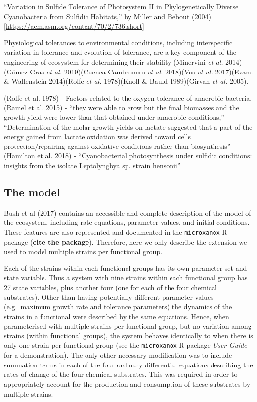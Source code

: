 \documentclass{article}
\begin{document}
``Variation in Sulfide Tolerance of Photosystem II in Phylogenetically
Diverse Cyanobacteria from Sulfidic Habitats,'' by Miller and Bebout
(2004) {[}\url{https://aem.asm.org/content/70/2/736.short}{]}

Physiological tolerances to environmental conditions, including
interspecific variation in tolerance and evolution of tolerance, are a
key component of the engineering of ecosystem for determining their
stability (Minervini \emph{et al.} 2014)(Gómez‐Gras \emph{et al.}
2019)(Cuenca Cambronero \emph{et al.} 2018)(Vos \emph{et al.}
2017)(Evans \& Wallenstein 2014)(Rolfe \emph{et al.} 1978)(Knoll \&
Bauld 1989)(Girvan \emph{et al.} 2005).

(Rolfe et al. 1978) - Factors related to the oxygen tolerance of
anaerobic bacteria. (Ramel et al. 2015) - ``they were able to grow but
the final biomasses and the growth yield were lower than that obtained
under anaerobic conditions,'' ``Determination of the molar growth yields
on lactate suggested that a part of the energy gained from lactate
oxidation was derived toward cells protection/repairing against
oxidative conditions rather than biosynthesis'' (Hamilton et al. 2018) -
``Cyanobacterial photosynthesis under sulfidic conditions: insights from
the isolate Leptolyngbya sp. strain hensonii''

\hypertarget{the-model}{%
\subsection{The model}\label{the-model}}

Bush et al (2017) contains an accessible and complete description of the
model of the ecosystem, including rate equations, parameter values, and
initial conditions. These features are also represented and documented
in the \texttt{microxanox} R package (\textbf{cite the package}).
Therefore, here we only describe the extension we used to model multiple
strains per functional group.

Each of the strains within each functional groups has its own parameter
set and state variable. Thus a system with nine strains within each
functional group has 27 state variables, plus another four (one for each
of the four chemical substrates). Other than having potentially
different parameter values (e.g.~maximum growth rate and tolerance
parameters) the dynamics of the strains in a functional were described
by the same equations. Hence, when parameterised with multiple strains
per functional group, but no variation among strains (within functional
groups), the system behaves identically to when there is only one strain
per functional group (see the \texttt{microxanox} R package \emph{User
Guide} for a demonstration). The only other necessary modification was
to include summation terms in each of the four ordinary differential
equations describing the rates of change of the four chemical
substrates. This was required in order to appropriately account for the
production and consumption of these substrates by multiple strains.
\end{document}
